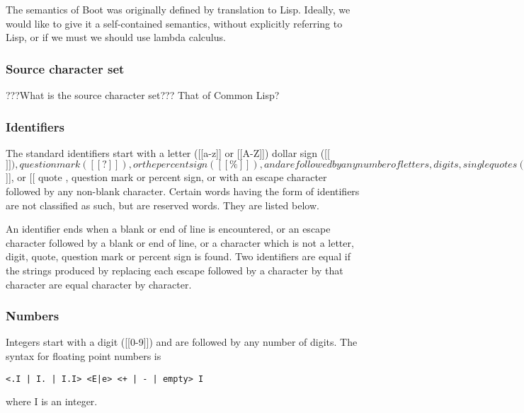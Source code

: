 \documentclass{article}
\begin{document}
The semantics of Boot was originally defined by translation to Lisp.
Ideally, we would like to give it a self-contained semantics,
without explicitly referring to Lisp, or if we must we should use
lambda calculus.

\subsubsection{Source character set}
\label{sec:boot:char-set}

???What is the source character set???  That of Common Lisp?

\subsubsection{Identifiers}
\label{sec:boot:identifier}

The standard identifiers start with a letter ([[a-z]] or [[A-Z]])
dollar sign ([[$]]), question mark ([[?]]), or the percent sign
([[\%]]), and are followed by any number of letters, digits, single
quotes([[']]), question marks, or percent signs.
It is possible however, by using the escape character ([[\_]]),
to construct identifiers that contain any
characters except the blank or newline character. The rules in this case
are that an escape character followed by any non-blank character
will start an identifier with that character.  Once an identifier
has been started either in this way or by a letter, [[$]], or
[[%
quote , question mark or percent sign, or with
an escape character followed by any non-blank character.
Certain words having the form of identifiers are not classified as
such, but are reserved words. They are listed below.

An identifier ends when a blank or end of line is encountered, or
an escape character followed by a blank or end of line, or a
character which is not a letter, digit, quote, question mark
or percent sign is found. Two identifiers are equal if the
strings produced by replacing each escape followed by a character
by that character are equal character by character.

\subsubsection{Numbers}
\label{sec:boot:number}

Integers start with a digit ([[0-9]]) and are followed by any number
of digits.  The syntax for floating point numbers is
\begin{verbatim}
<.I | I. | I.I> <E|e> <+ | - | empty> I
\end{verbatim}
where I is an integer.
\end{document}
